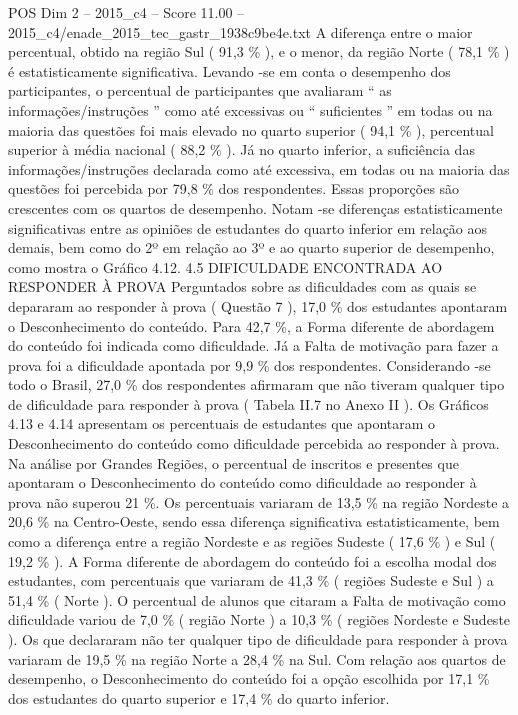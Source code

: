 \begin{textsample}{POS Dim 2 – 2015\_c4 – Score 11.00 – 2015\_c4/enade\_2015\_tec\_gastr\_1938c9be4e.txt}
A diferença entre o maior percentual, obtido na região Sul ( 91,3 \% ), e o menor, da região Norte ( 78,1 \% ) é estatisticamente significativa.
Levando -se em conta o desempenho dos participantes, o percentual de participantes que avaliaram “ as informações/instruções ” como até excessivas ou “ suficientes ” em todas ou na maioria das questões foi mais elevado no quarto superior ( 94,1 \% ), percentual superior à média nacional ( 88,2 \% ).
Já no quarto inferior, a suficiência das informações/instruções declarada como até excessiva, em todas ou na maioria das questões foi percebida por 79,8 \% dos respondentes.
Essas proporções são crescentes com os quartos de desempenho.
Notam -se diferenças estatisticamente significativas entre as opiniões de estudantes do quarto inferior em relação aos demais, bem como do 2º em relação ao 3º e ao quarto superior de desempenho, como mostra o Gráfico 4.12. 4.5 DIFICULDADE ENCONTRADA AO RESPONDER À PROVA Perguntados sobre as dificuldades com as quais se depararam ao responder à prova ( Questão 7 ), 17,0 \% dos estudantes apontaram o Desconhecimento do conteúdo.
Para 42,7 \%, a Forma diferente de abordagem do conteúdo foi indicada como dificuldade.
Já a Falta de motivação para fazer a prova foi a dificuldade apontada por 9,9 \% dos respondentes.
Considerando -se todo o Brasil, 27,0 \% dos respondentes afirmaram que não tiveram qualquer tipo de dificuldade para responder à prova ( Tabela II.7 no Anexo II ).
Os Gráficos 4.13 e 4.14 apresentam os percentuais de estudantes que apontaram o Desconhecimento do conteúdo como dificuldade percebida ao responder à prova.
Na análise por Grandes Regiões, o percentual de inscritos e presentes que apontaram o Desconhecimento do conteúdo como dificuldade ao responder à prova não superou 21 \%.
Os percentuais variaram de 13,5 \% na região Nordeste a 20,6 \% na Centro-Oeste, sendo essa diferença significativa estatisticamente, bem como a diferença entre a região Nordeste e as regiões Sudeste ( 17,6 \% ) e Sul ( 19,2 \% ).
A Forma diferente de abordagem do conteúdo foi a escolha modal dos estudantes, com percentuais que variaram de 41,3 \% ( regiões Sudeste e Sul ) a 51,4 \% ( Norte ).
O percentual de alunos que citaram a Falta de motivação como dificuldade variou de 7,0 \% ( região Norte ) a 10,3 \% ( regiões Nordeste e Sudeste ).
Os que declararam não ter qualquer tipo de dificuldade para responder à prova variaram de 19,5 \% na região Norte a 28,4 \% na Sul.
Com relação aos quartos de desempenho, o Desconhecimento do conteúdo foi a opção escolhida por 17,1 \% dos estudantes do quarto superior e 17,4 \% do quarto inferior.

\end{textsample}
